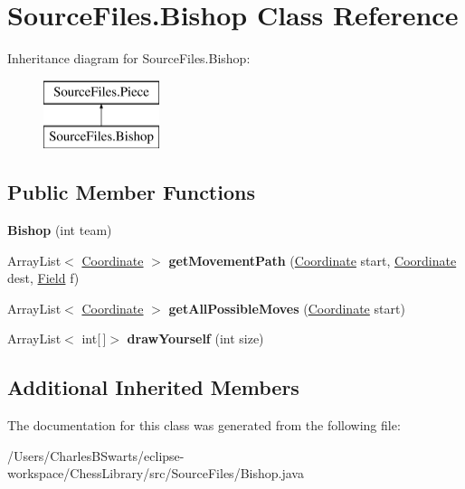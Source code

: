 \hypertarget{class_source_files_1_1_bishop}{}\section{Source\+Files.\+Bishop Class Reference}
\label{class_source_files_1_1_bishop}
Inheritance diagram for Source\+Files.\+Bishop\+:\begin{figure}[H]
\begin{center}
\leavevmode
\includegraphics[height=2.000000cm]{class_source_files_1_1_bishop}
\end{center}
\end{figure}
\subsection*{Public Member Functions}
\begin{DoxyCompactItemize}
\item 
\mbox{\label{class_source_files_1_1_bishop_a724b797ae52cff00d2de4d1313a350db}} 
{\bfseries Bishop} (int team)
\item 
\mbox{\label{class_source_files_1_1_bishop_a6dab57f8f7853fb2f9761036b2fe6ada}} 
Array\+List$<$ \mbox{\hyperlink{class_source_files_1_1_coordinate}{Coordinate}} $>$ {\bfseries get\+Movement\+Path} (\mbox{\hyperlink{class_source_files_1_1_coordinate}{Coordinate}} start, \mbox{\hyperlink{class_source_files_1_1_coordinate}{Coordinate}} dest, \mbox{\hyperlink{class_source_files_1_1_field}{Field}} f)
\item 
\mbox{\label{class_source_files_1_1_bishop_a468a6273cadc128e711bcb850860900e}} 
Array\+List$<$ \mbox{\hyperlink{class_source_files_1_1_coordinate}{Coordinate}} $>$ {\bfseries get\+All\+Possible\+Moves} (\mbox{\hyperlink{class_source_files_1_1_coordinate}{Coordinate}} start)
\item 
\mbox{\label{class_source_files_1_1_bishop_abfc630755ddc003e009a699e66fadd8e}} 
Array\+List$<$ int\mbox{[}$\,$\mbox{]}$>$ {\bfseries draw\+Yourself} (int size)
\end{DoxyCompactItemize}
\subsection*{Additional Inherited Members}


The documentation for this class was generated from the following file\+:\begin{DoxyCompactItemize}
\item 
/\+Users/\+Charles\+B\+Swarts/eclipse-\/workspace/\+Chess\+Library/src/\+Source\+Files/Bishop.\+java\end{DoxyCompactItemize}
